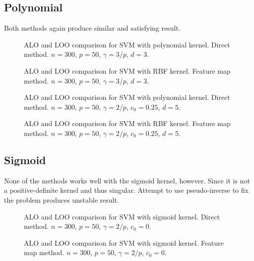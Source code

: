 \documentclass[11pt]{article}
\begin{document}
\subsection{Polynomial}
Both methods again produce similar and satisfying result.
\begin{figure}[H]
	\centering
	
	\caption{ALO and LOO comparison for SVM with polynomial kernel. Direct method. \(n=300\), \(p=50\), \(\gamma=3/p\), \(d=3\).}
\end{figure}
\begin{figure}[H]
	\centering
	
	\caption{ALO and LOO comparison for SVM with RBF kernel. Feature map method. \(n=300\), \(p=50\), \(\gamma=3/p\), \(d=3\).}
\end{figure}
\begin{figure}[H]
	\centering
	
	\caption{ALO and LOO comparison for SVM with polynomial kernel. Direct method. \(n=300\), \(p=50\), \(\gamma=2/p\), \(c_0=0.25\), \(d=5\).}
\end{figure}
\begin{figure}[H]
	\centering
	
	\caption{ALO and LOO comparison for SVM with RBF kernel. Feature map method. \(n=300\), \(p=50\), \(\gamma=2/p\), \(c_0=0.25\), \(d=5\).}
\end{figure}

\subsection{Sigmoid}
None of the methods works well with the sigmoid kernel, however. Since it is not a positive-definite kernel and thus singular. Attempt to use pseudo-inverse to fix the problem produces unstable result.

\begin{figure}[H]
	\centering
	
	\caption{ALO and LOO comparison for SVM with sigmoid kernel. Direct method. \(n=300\), \(p=50\), \(\gamma=2/p\), \(c_0=0\).}
\end{figure}
\begin{figure}[H]
	\centering
	
	\caption{ALO and LOO comparison for SVM with sigmoid kernel. Feature map method. \(n=300\), \(p=50\), \(\gamma=2/p\), \(c_0=0\).}
\end{figure}
\end{document}
